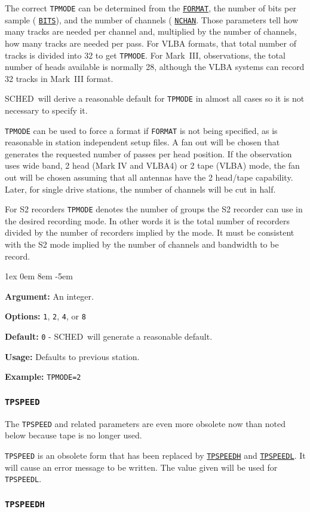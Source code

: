 \documentclass{report}
\newcommand{\schedb}{{\sc SCHED~}}
\newcommand{\rcwbox}[5]{
  \begin{list}{}{\parsep 1ex  \itemsep 0em
                 \leftmargin 8em  \itemindent -5em }
    \item {\bf Argument:} #1
    \item {\bf Options:}  #2
    \item {\bf Default:}  #3
    \item {\bf Usage:}    #4
    \item {\bf Example:}  #5
  \end{list}
}
\begin{document}
The correct {\tt TPMODE} can be determined from the 
{\hyperref[SP:FORMAT]{{\tt FORMAT}}}, the number of bits per sample (
{\hyperref[SP:BITS]{{\tt BITS}}}), and the number of channels (
{\hyperref[SP:NCHAN]{{\tt NCHAN}}}.
Those parameters tell how many tracks are needed per channel and,
multiplied by the number of channels, how many tracks are needed per
pass.  For VLBA formats, that total number of tracks is divided into
32 to get {\tt TPMODE}.  For Mark~III, observations, the total number
of heads available is normally 28, although the VLBA systems can
record 32 tracks in Mark~III format.

\schedb will derive a reasonable default for {\tt TPMODE} in almost
all cases so it is not necessary to specify it.

{\tt TPMODE} can be used to force a format if {\tt FORMAT} is not being
specified, as is reasonable in station independent setup files.  A fan
out will be chosen that generates the requested number of passes per
head position.  If the observation uses wide band, 2 head (Mark IV and
VLBA4) or 2 tape (VLBA) mode, the fan out will be chosen assuming that
all antennas have the 2 head/tape capability.  Later, for single drive
stations, the number of channels will be cut in half.

For S2 recorders {\tt TPMODE} denotes the number of groups the S2
recorder can use in the desired recording mode. In other words it is
the total number of recorders divided by the number of recorders
implied by the mode. It must be consistent with the S2 mode implied by
the number of channels and bandwidth to be record.

\rcwbox
{An integer.}
{{\tt 1}, {\tt 2}, {\tt 4}, or {\tt 8}}
{{\tt 0} - \schedb will generate a reasonable default.}
{Defaults to previous station.}
{{\tt TPMODE=2}}


\subsubsection{\label{SP:TPSPEED}{\tt TPSPEED}}

The {\tt TPSPEED}  and related parameters are even more obsolete
now than noted below because tape is no longer used.

{\tt TPSPEED} is an obsolete form that has been replaced by
{\hyperref[SP:TPSPEEDH]{{\tt TPSPEEDH}}} and
{\hyperref[SP:TPSPEEDL]{{\tt TPSPEEDL}}}.  It will cause an
error message to be written.  The value given will be used for
{\tt TPSPEEDL}.

\subsubsection{\label{SP:TPSPEEDH}{\tt TPSPEEDH}}
\end{document}
